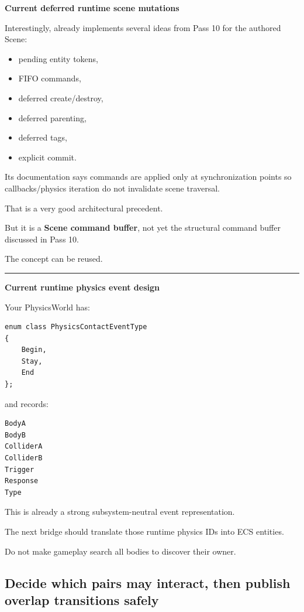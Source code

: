 \textbf{Current deferred runtime scene mutations}

Interestingly,  already implements several ideas from Pass 10 for the authored Scene:

\begin{itemize}
\tightlist
\item
  pending entity tokens,
\item
  FIFO commands,
\item
  deferred create/destroy,
\item
  deferred parenting,
\item
  deferred tags,
\item
  explicit commit.
\end{itemize}

Its documentation says commands are applied only at synchronization points so callbacks/physics iteration do not invalidate scene traversal.

That is a very good architectural precedent.

But it is a \textbf{Scene command buffer}, not yet the  structural command buffer discussed in Pass 10.

The concept can be reused.

\begin{center}\rule{0.5\linewidth}{0.5pt}\end{center}

\textbf{Current runtime physics event design}

Your PhysicsWorld has:

\begin{verbatim}
enum class PhysicsContactEventType
{
    Begin,
    Stay,
    End
};
\end{verbatim}

and records:

\begin{verbatim}
BodyA
BodyB
ColliderA
ColliderB
Trigger
Response
Type
\end{verbatim}

This is already a strong subsystem-neutral event representation.

The next bridge should translate those runtime physics IDs into ECS entities.

Do not make gameplay search all bodies to discover their owner.

\subsection{Decide which pairs may interact, then publish overlap transitions safely}\label{05-engine-i-ch017-decide-which-pairs-may-interact-then-publish-overlap-transitions-safely}

